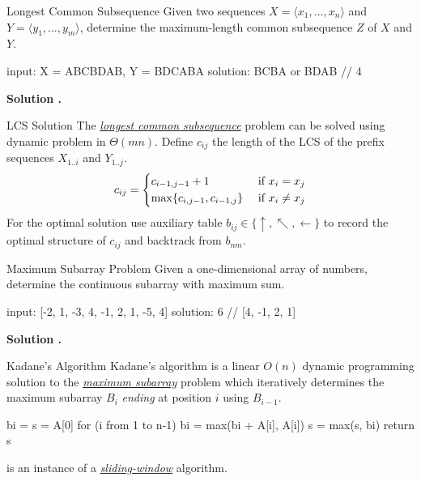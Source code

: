 \documentclass{cognito}
\begin{document}
\begin{note}{Longest Common Subsequence}
	Given two sequences $X = \langle x_1, ..., x_n \rangle$ and $Y = \langle y_1, ..., y_m \rangle $, determine the maximum-length common subsequence $Z$ of $X$ and $Y$.
	\begin{largecode}
 input:    X = ABCBDAB, Y = BDCABA
 solution: BCBA or BDAB  // 4
	\end{largecode}
	\bf Solution \hyperref[note:LCS Solution]{\solutionref}.
\end{note}

\begin{note}{LCS Solution}
	The \hyperref[note:Longest Common Subsequence]{\it longest common subsequence} problem can be solved using dynamic problem in $\Theta(mn)$.
	Define $c_{ij}$ the length of the LCS of the prefix sequences $X_{1..i}$ and $Y_{1..j}$.
	$$
		c_{ij} = \begin{dcases}
			c_{i-1,j-1} + 1 & \text{ if } x_i = x_j\\
			\max\{ c_{i,j-1}, c_{i-1,j} \} & \text{ if } x_i \neq x_j
		\end{dcases}
	$$
	For the optimal solution use auxiliary table $b_{ij} \in \{\uparrow, \nwarrow, \leftarrow \}$ to record
	the optimal structure of $c_{ij}$ and backtrack from $b_{nm}$.
\end{note}



\begin{note}{Maximum Subarray Problem}
	Given a one-dimensional array of numbers, determine the continuous subarray with maximum sum.
	\begin{largecode}
 input: [-2, 1, -3, 4, -1, 2, 1, -5, 4]
 solution: 6  // [4, -1, 2, 1]
	\end{largecode}
	\bf Solution \hyperref[note:Kadane's Algorithm]{\solutionref}.
\end{note}

\begin{note}{Kadane's Algorithm}
	Kadane's algorithm is a linear $O(n)$ dynamic programming solution to the \hyperref[note:Maximum Subarray Problem]{\it maximum subarray} problem
	which iteratively determines the maximum subarray $B_i$ {\it ending} at position $i$ using $B_{i-1}$.

\begin{largecode}
 bi = s = A[0]
 for (i from 1 to n-1)
 	bi = max(bi + A[i], A[i])
	s = max(s, bi)
 return s
\end{largecode}
	\begin{remark}  is an instance of a \hyperref[note:Sliding Window Method]{\it sliding-window} algorithm.\end{remark} \vspace{-5pt}
\end{note}
\end{document}
